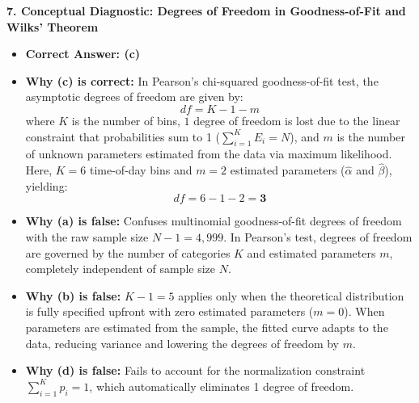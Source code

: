 \textbf{7. Conceptual Diagnostic: Degrees of Freedom in Goodness-of-Fit and Wilks' Theorem}
\begin{itemize}
    \item \textbf{Correct Answer: (c)}
    \item \textbf{Why (c) is correct:} In Pearson's chi-squared goodness-of-fit test, the asymptotic degrees of freedom are given by:
    $$df = K - 1 - m$$
    where $K$ is the number of bins, $1$ degree of freedom is lost due to the linear constraint that probabilities sum to 1 ($\sum_{i=1}^K E_i = N$), and $m$ is the number of unknown parameters estimated from the data via maximum likelihood. Here, $K = 6$ time-of-day bins and $m = 2$ estimated parameters ($\hat{\alpha}$ and $\hat{\beta}$), yielding:
    $$df = 6 - 1 - 2 = \mathbf{3}$$
    \item \textbf{Why (a) is false:} Confuses multinomial goodness-of-fit degrees of freedom with the raw sample size $N - 1 = 4{,}999$. In Pearson's test, degrees of freedom are governed by the number of categories $K$ and estimated parameters $m$, completely independent of sample size $N$.
    \item \textbf{Why (b) is false:} $K - 1 = 5$ applies only when the theoretical distribution is fully specified upfront with zero estimated parameters ($m = 0$). When parameters are estimated from the sample, the fitted curve adapts to the data, reducing variance and lowering the degrees of freedom by $m$.
    \item \textbf{Why (d) is false:} Fails to account for the normalization constraint $\sum_{i=1}^K p_i = 1$, which automatically eliminates 1 degree of freedom.
\end{itemize}












